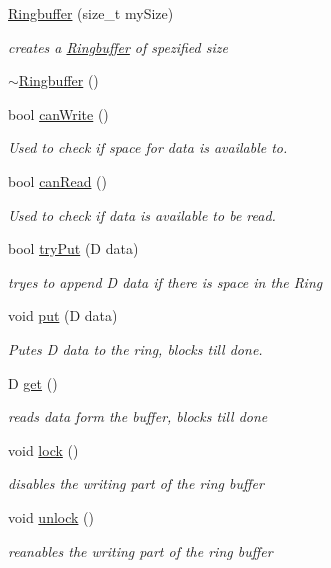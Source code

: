 \begin{DoxyCompactItemize}
\item 
\hyperlink{classllu_1_1datastructs_1_1_ringbuffer_ab214a718ecf06d2911bd6f1e0e597fd8}{Ringbuffer} (size\+\_\+t my\+Size)
\begin{DoxyCompactList}\small\item\em creates a \hyperlink{classllu_1_1datastructs_1_1_ringbuffer}{Ringbuffer} of spezified size \end{DoxyCompactList}\item 
\hyperlink{classllu_1_1datastructs_1_1_ringbuffer_a18eaeb15f671f0ff28f8f6331d8e8cb5}{$\sim$\+Ringbuffer} ()
\item 
bool \hyperlink{classllu_1_1datastructs_1_1_ringbuffer_a42ad2af5a94eb3400aacbc02ff8f273f}{can\+Write} ()
\begin{DoxyCompactList}\small\item\em Used to check if space for data is available to. \end{DoxyCompactList}\item 
bool \hyperlink{classllu_1_1datastructs_1_1_ringbuffer_a192ce859addf55634c277465c5d8b167}{can\+Read} ()
\begin{DoxyCompactList}\small\item\em Used to check if data is available to be read. \end{DoxyCompactList}\item 
bool \hyperlink{classllu_1_1datastructs_1_1_ringbuffer_a9d0c1109ed1e655b6e8ee9eb68550552}{try\+Put} (D data)
\begin{DoxyCompactList}\small\item\em tryes to append D data if there is space in the Ring \end{DoxyCompactList}\item 
void \hyperlink{classllu_1_1datastructs_1_1_ringbuffer_a883dd9d2e40532aa255c4c12299bf490}{put} (D data)
\begin{DoxyCompactList}\small\item\em Putes D data to the ring, blocks till done. \end{DoxyCompactList}\item 
D \hyperlink{classllu_1_1datastructs_1_1_ringbuffer_aba608e48dea9366fe553341301409508}{get} ()
\begin{DoxyCompactList}\small\item\em reads data form the buffer, blocks till done \end{DoxyCompactList}\item 
void \hyperlink{classllu_1_1datastructs_1_1_ringbuffer_ab3ef1d293fe716106cf8b22259d6970b}{lock} ()
\begin{DoxyCompactList}\small\item\em disables the writing part of the ring buffer \end{DoxyCompactList}\item 
void \hyperlink{classllu_1_1datastructs_1_1_ringbuffer_af0f39cea25a6c196a5c16f3cc8534827}{unlock} ()
\begin{DoxyCompactList}\small\item\em reanables the writing part of the ring buffer \end{DoxyCompactList}\end{DoxyCompactItemize}


